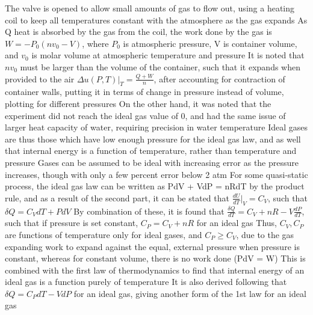 \begin{outline*}
\4 The valve is opened to allow small amounts of gas to flow out, using a heating coil to keep all temperatures constant with the atmosphere as the gas expands
\4 As Q heat is absorbed by the gas from the coil, the work done by the gas is $W = -P_0(nv_0 - V)$, where $P_0$ is atmospheric pressure, V is container volume, and $v_0$ is molar volume at atmospheric temperature and pressure
\4 It is noted that $nv_0$ must be larger than the volume of the container, such that it expands when provided to the air
\4 $\Delta u(P, T)|_T = \frac{Q + W}{n}$, after accounting for contraction of container walls, putting it in terms of change in pressure instead of volume, plotting for different pressures
\3 On the other hand, it was noted that the experiment did not reach the ideal gas value of 0, and had the same issue of larger heat capacity of water, requiring precision in water temperature
\1 Ideal gases are thus those which have low enough pressure for the ideal gas law, and as well that internal energy is a function of temperature, rather than temperature and pressure
\2 Gases can be assumed to be ideal with increasing error as the pressure increases, though with only a few percent error below 2 atm
\2 For some quasi-static process, the ideal gas law can be written as PdV + VdP =  nRdT by the product rule, and as a result of the second part, it can be stated that $\frac{dU}{dT}|_V = C_V$, such that $\delta Q = C_VdT + PdV$
\3 By combination of these, it is found that $\frac{\delta Q}{dT} = C_V + nR - V\frac{dP}{dT}$, such that if pressure is set constant, $C_P = C_V + nR$ for an ideal gas
\3 Thus, $C_V, C_P$ are functions of temperature only for ideal gases, and $C_P \geq C_V$, due to the gas expanding work to expand against the equal, external pressure when pressure is constant, whereas for constant volume, there is no work done (PdV = W)
\3 This is combined with the first law of thermodynamics to find that internal energy of an ideal gas is a function purely of temperature
\2 It is also derived following that $\delta Q = C_PdT - VdP$ for an ideal gas, giving another form of the 1st law for an ideal gas
\end{outline*}
